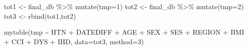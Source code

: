 \documentclass[
]{book}
\newenvironment{Shaded}{\begin{snugshade}}{\end{snugshade}}
\newcommand{\AttributeTok}[1]{\textcolor[rgb]{0.77,0.63,0.00}{#1}}
\newcommand{\DecValTok}[1]{\textcolor[rgb]{0.00,0.00,0.81}{#1}}
\newcommand{\FunctionTok}[1]{\textcolor[rgb]{0.00,0.00,0.00}{#1}}
\newcommand{\NormalTok}[1]{#1}
\newcommand{\OtherTok}[1]{\textcolor[rgb]{0.56,0.35,0.01}{#1}}
\newcommand{\SpecialCharTok}[1]{\textcolor[rgb]{0.00,0.00,0.00}{#1}}
\theoremstyle{definition}
\theoremstyle{definition}
\theoremstyle{definition}
\theoremstyle{definition}
\theoremstyle{remark}
\begin{document}
\begin{Shaded}
\begin{Highlighting}[]
\NormalTok{tot1 }\OtherTok{\textless{}{-}}\NormalTok{ final\_db }\SpecialCharTok{\%\textgreater{}\%} \FunctionTok{mutate}\NormalTok{(}\AttributeTok{tmp=}\DecValTok{1}\NormalTok{)}
\NormalTok{tot2 }\OtherTok{\textless{}{-}}\NormalTok{ final\_db }\SpecialCharTok{\%\textgreater{}\%} \FunctionTok{mutate}\NormalTok{(}\AttributeTok{tmp=}\DecValTok{2}\NormalTok{)}
\NormalTok{tot3 }\OtherTok{\textless{}{-}} \FunctionTok{rbind}\NormalTok{(tot1,tot2)}

\FunctionTok{mytable}\NormalTok{(tmp }\SpecialCharTok{\textasciitilde{}}\NormalTok{ HTN }\SpecialCharTok{+}\NormalTok{ DATEDIFF }\SpecialCharTok{+}\NormalTok{ AGE }\SpecialCharTok{+}\NormalTok{ SEX }\SpecialCharTok{+}\NormalTok{ SES }\SpecialCharTok{+}\NormalTok{ REGION }\SpecialCharTok{+}\NormalTok{ BMI }\SpecialCharTok{+}\NormalTok{ CCI }\SpecialCharTok{+}\NormalTok{ DYS }\SpecialCharTok{+}\NormalTok{ IHD, }\AttributeTok{data=}\NormalTok{tot3, }\AttributeTok{method=}\DecValTok{3}\NormalTok{)}
\end{Highlighting}
\end{Shaded}
\end{document}
